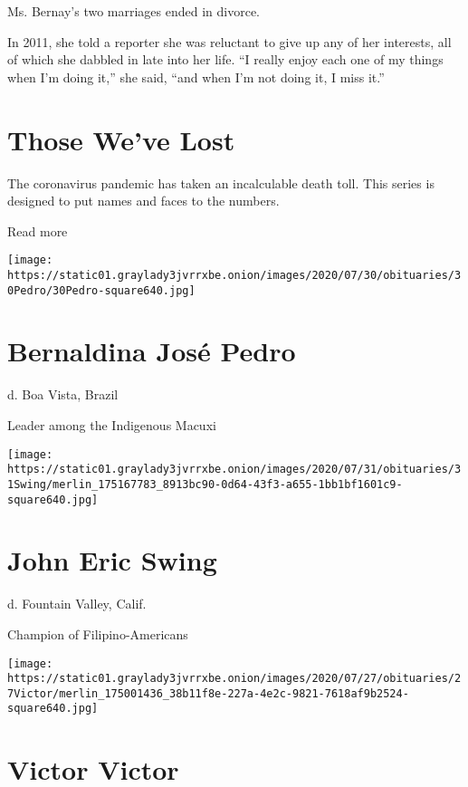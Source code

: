 Ms. Bernay's two marriages ended in divorce.

In 2011, she told a reporter she was reluctant to give up any of her
interests, all of which she dabbled in late into her life. ``I really
enjoy each one of my things when I'm doing it,'' she said, ``and when
I'm not doing it, I miss it.''

\href{https://www.nytimes3xbfgragh.onion/interactive/2020/obituaries/people-died-coronavirus-obituaries.html?action=click\&pgtype=Article\&state=default\&region=BELOW_MAIN_CONTENT\&context=covid_obits_promo}{}

\hypertarget{those-weve-lost}{%
\section{Those We've Lost}\label{those-weve-lost}}

The coronavirus pandemic has taken an incalculable death toll. This
series is designed to put names and faces to the numbers.

Read more

\texttt{[image: https://static01.graylady3jvrrxbe.onion/images/2020/07/30/obituaries/30Pedro/30Pedro-square640.jpg]}

\hypertarget{bernaldina-josuxe9-pedro}{%
\section{Bernaldina José Pedro}\label{bernaldina-josuxe9-pedro}}

d. Boa Vista, Brazil

Leader among the Indigenous Macuxi

\texttt{[image: https://static01.graylady3jvrrxbe.onion/images/2020/07/31/obituaries/31Swing/merlin\_175167783\_8913bc90-0d64-43f3-a655-1bb1bf1601c9-square640.jpg]}

\hypertarget{john-eric-swing}{%
\section{John Eric Swing}\label{john-eric-swing}}

d. Fountain Valley, Calif.

Champion of Filipino-Americans

\texttt{[image: https://static01.graylady3jvrrxbe.onion/images/2020/07/27/obituaries/27Victor/merlin\_175001436\_38b11f8e-227a-4e2c-9821-7618af9b2524-square640.jpg]}

\hypertarget{victor-victor}{%
\section{Victor Victor}\label{victor-victor}}

